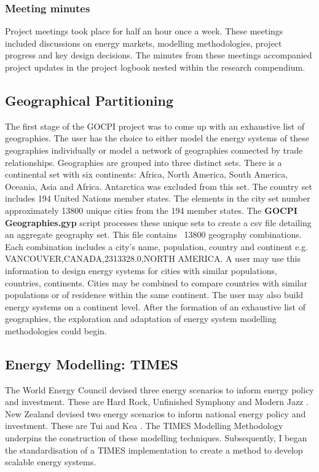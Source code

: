 \documentclass[12pt]{article}
\begin{document}
\subsubsection{Meeting minutes}
Project meetings took place for half an hour once a week. 
These meetings included discussions on energy markets, modelling methodologies, project progress and key design decisions.
The minutes from these meetings accompanied project updates in the project logbook nested within the research compendium.

\subsection{Geographical Partitioning}\label{geopar}
The first stage of the GOCPI project was to come up with an exhaustive list of geographies. 
The user has the choice to either model the energy systems of these geographies individually or model a network of geographies connected by trade relationships.
Geographies are grouped into three distinct sets. There is a continental set with six continents: Africa, North America, South America, Oceania, Asia and Africa.
Antarctica was excluded from this set.
The country set includes 194 United Nations member states. The elements in the city set number approximately 13800 unique cities from the 194 member states.
The \textbf{GOCPI Geographies.gyp} script processes these unique sets to create a csv file detailing an aggregate geography set.
This file contains ~13800 geography combinations. Each combination includes a city's name, population, country and continent e.g. VANCOUVER,CANADA,2313328.0,NORTH AMERICA.
A user may use this information to design energy systems for cities with similar populations, countries, continents. 
Cities may be combined to compare countries with similar populations or of residence within the same continent.
The user may also build energy systems on a continent level. After the formation of an exhaustive list of geographies, the exploration and adaptation of energy system modelling
methodologies could begin.

\subsection{Energy Modelling: TIMES}
The World Energy Council devised three energy scenarios to inform energy policy and investment. These are Hard Rock, Unfinished Symphony and Modern Jazz \cite{TR:8}.
New Zealand devised two energy scenarios to inform national energy policy and investment. These are Tui and Kea \cite{TR:2}. 
The TIMES Modelling Methodology underpins the construction of these modelling techniques.
Subsequently, I began the standardisation of a TIMES implementation to create a method to develop scalable energy systems.
\end{document}
